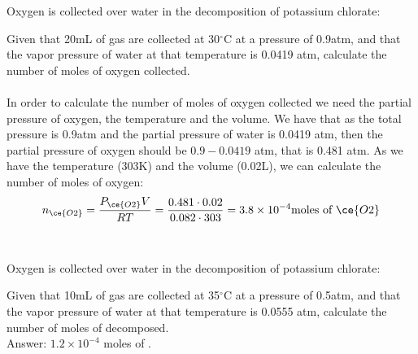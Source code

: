 \documentclass[main.tex]{subfiles}
\begin{document}
\begin{description}
\begin{example} %
Oxygen is collected over water in the decomposition of potassium chlorate:
\begin{center}\end{center}
Given that 20mL of gas are collected at 30$^{\circ}$C at a pressure of 0.9atm, and that the vapor pressure of water at that temperature is 0.0419 atm, calculate the number of moles of oxygen collected.
\\
\\
In order to calculate the number of moles of oxygen collected we need the partial pressure of oxygen, the temperature and the volume. We have that as the total pressure is 0.9atm and the partial pressure of water is 0.0419 atm, then the partial pressure of oxygen should be $0.9-0.0419$ atm, that is 0.481 atm. As we have the temperature (303K) and the volume (0.02L), we can calculate the number of moles of oxygen:
\[n_{\ce{O2}}=\frac{P_{\ce{O2}}V}{RT}=\frac{0.481\cdot 0.02}{0.082\cdot 303}=3.8\times 10^{-4}\text{moles of }\ce{O2}\]
\\
\faDiamond\ \\
Oxygen is collected over water in the decomposition of potassium chlorate:
\begin{center}\end{center}
Given that 10mL of gas are collected at 35$^{\circ}$C at a pressure of 0.5atm, and that the vapor pressure of water at that temperature is 0.0555 atm, calculate the number of moles of  decomposed.
\\
\flushright Answer: $1.2\times 10^{-4}$ moles of .
\end{example}%




\end{description}
\end{document}
